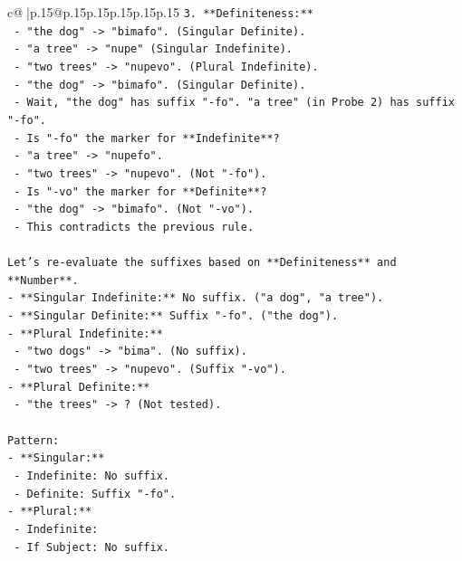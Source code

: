 \documentclass{article}
\begin{document}
{\begin{supertabular}{c@{$\;$}|p{.15\linewidth}@{}p{.15\linewidth}p{.15\linewidth}p{.15\linewidth}p{.15\linewidth}p{.15\linewidth}}
{{{\texttt{3.  **Definiteness:**} \\
\texttt{    {-} "the dog" {-}> "bimafo". (Singular Definite).} \\
\texttt{    {-} "a tree" {-}> "nupe" (Singular Indefinite).} \\
\texttt{    {-} "two trees" {-}> "nupevo". (Plural Indefinite).} \\
\texttt{    {-} "the dog" {-}> "bimafo". (Singular Definite).} \\
\texttt{    {-} Wait, "the dog" has suffix "{-}fo". "a tree" (in Probe 2) has suffix "{-}fo".} \\
\texttt{    {-} Is "{-}fo" the marker for **Indefinite**?} \\
\texttt{        {-} "a tree" {-}> "nupefo".} \\
\texttt{        {-} "two trees" {-}> "nupevo". (Not "{-}fo").} \\
\texttt{    {-} Is "{-}vo" the marker for **Definite**?} \\
\texttt{        {-} "the dog" {-}> "bimafo". (Not "{-}vo").} \\
\texttt{    {-} This contradicts the previous rule.} \\
\\ 
\texttt{Let's re{-}evaluate the suffixes based on **Definiteness** and **Number**.} \\
\texttt{{-} **Singular Indefinite:** No suffix. ("a dog", "a tree").} \\
\texttt{{-} **Singular Definite:** Suffix "{-}fo". ("the dog").} \\
\texttt{{-} **Plural Indefinite:**} \\
\texttt{  {-} "two dogs" {-}> "bima". (No suffix).} \\
\texttt{  {-} "two trees" {-}> "nupevo". (Suffix "{-}vo").} \\
\texttt{{-} **Plural Definite:**} \\
\texttt{  {-} "the trees" {-}> ? (Not tested).} \\
\\ 
\texttt{Pattern:} \\
\texttt{{-} **Singular:**} \\
\texttt{  {-} Indefinite: No suffix.} \\
\texttt{  {-} Definite: Suffix "{-}fo".} \\
\texttt{{-} **Plural:**} \\
\texttt{  {-} Indefinite:} \\
\texttt{    {-} If Subject: No suffix.} \\
}}}
\end{supertabular}}
\end{document}
